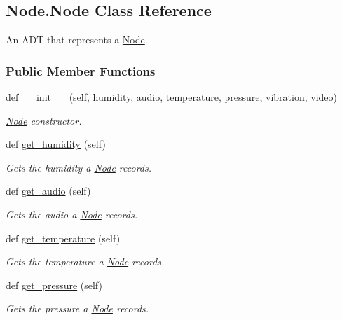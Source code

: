 \hypertarget{class_node_1_1_node}{}\subsection{Node.\+Node Class Reference}
\label{class_node_1_1_node}


An A\+DT that represents a \mbox{\hyperlink{class_node_1_1_node}{Node}}.  


\subsubsection*{Public Member Functions}
\begin{DoxyCompactItemize}
\item 
def \mbox{\hyperlink{class_node_1_1_node_aeec2c57379a8099ac1e85e3ad8cf3699}{\+\_\+\+\_\+init\+\_\+\+\_\+}} (self, humidity, audio, temperature, pressure, vibration, video)
\begin{DoxyCompactList}\small\item\em \mbox{\hyperlink{class_node_1_1_node}{Node}} constructor. \end{DoxyCompactList}\item 
def \mbox{\hyperlink{class_node_1_1_node_ac263b1d61ca39497828fa89edfd1ccb5}{get\+\_\+humidity}} (self)
\begin{DoxyCompactList}\small\item\em Gets the humidity a \mbox{\hyperlink{class_node_1_1_node}{Node}} records. \end{DoxyCompactList}\item 
def \mbox{\hyperlink{class_node_1_1_node_a2e12679376ca18a98f47a6988d310340}{get\+\_\+audio}} (self)
\begin{DoxyCompactList}\small\item\em Gets the audio a \mbox{\hyperlink{class_node_1_1_node}{Node}} records. \end{DoxyCompactList}\item 
def \mbox{\hyperlink{class_node_1_1_node_a81b81432378f3793c80bad9745e67da6}{get\+\_\+temperature}} (self)
\begin{DoxyCompactList}\small\item\em Gets the temperature a \mbox{\hyperlink{class_node_1_1_node}{Node}} records. \end{DoxyCompactList}\item 
def \mbox{\hyperlink{class_node_1_1_node_a1ef7ba3e5df86018bc19d9a3312b9c37}{get\+\_\+pressure}} (self)
\begin{DoxyCompactList}\small\item\em Gets the pressure a \mbox{\hyperlink{class_node_1_1_node}{Node}} records. \end{DoxyCompactList}\item 

\end{DoxyCompactItemize}
